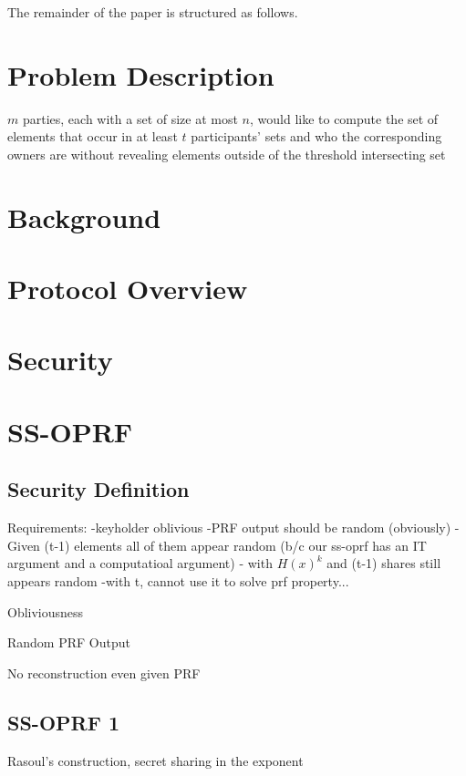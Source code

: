 \documentclass[10pt, sigconf]{acmart}
\begin{document}
The remainder of the paper is structured as follows.



\section{Problem Description}

$m$ parties, each with a set of size at most $n$, would like to compute the set of elements that occur in at least $t$ participants' sets and who the corresponding owners are without revealing elements outside of the threshold intersecting set


\section{Background}


\section{Protocol Overview}


\section{Security}



\section{SS-OPRF}

\subsection{Security Definition}


Requirements: 
-keyholder oblivious
-PRF output should be random (obviously)
- Given (t-1) elements all of them appear random (b/c our ss-oprf has an IT argument and a computatioal argument)
- with $H(x)^k$ and (t-1) shares still appears random 
-with t, cannot use it to solve prf property...


Obliviousness

Random PRF Output

No reconstruction even given PRF

\subsection{SS-OPRF 1}

Rasoul's construction, secret sharing in the exponent
\end{document}
